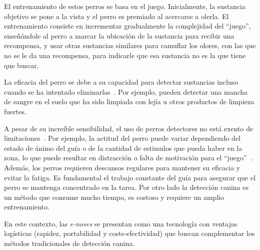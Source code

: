 El entrenamiento de estos perros se basa en el juego. Inicialmente, la sustancia objetivo se pone a la vista y el perro es premiado al acercarse a olerla. El entrenamiento consiste en incrementar gradualmente la complejidad del ``juego'', enseñándole al perro a marcar la ubicación de la sustancia para recibir una recompensa, y usar otras sustancias similares para camuflar los olores, con las que no se le da una recompensa, para indicarle que esa sustancia no es la que tiene que buscar.
\par

La eficacia del perro se debe a su capacidad para detectar sustancias incluso cuando se ha intentado eliminarlas~\cite{GazitTerkel2003}. Por ejemplo, pueden detectar una mancha de sangre en el suelo que ha sido limpiada con lejía u otros productos de limpieza fuertes.
\par

A pesar de su increíble sensibilidad, el uso de perros detectores no está exento de limitaciones~\cite{FurtonMyers2001}. Por ejemplo, la actitud del perro puede variar dependiendo del estado de ánimo del guía o de la cantidad de estimulos que pueda haber en la zona, lo que puede resultar en distracción o falta de motivación para el ``juego''~\cite{Lit2011}. Además, los perros requieren descansos regulares para mantener su eficacia y evitar la fatiga. Es fundamental el trabajo constante del guía para asegurar que el perro se mantenga concentrado en la tarea. Por otro lado la detección canina es un método que consume mucho tiempo, es costoso y requiere un amplio entrenamiento.
\par

En este contexto, las \textit{e-noses} se presentan como una tecnología con ventajas logísticas (rapidez, portabilidad y coste-efectividad) que buscan complementar los métodos tradicionales de detección canina.